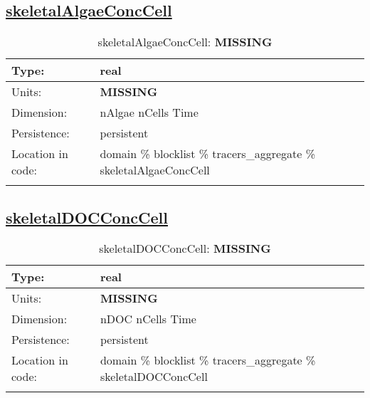 \subsection[skeletalAlgaeConcCell]{\hyperref[sec:var_tab_tracers_aggregate]{skeletalAlgaeConcCell}}
\label{subsec:var_sec_tracers_aggregate_skeletalAlgaeConcCell}
\begin{center}
\begin{longtable}{| p{2.0in} | p{4.0in} |}
        \hline 
        Type: & real \\
        \hline 
        Units: & {\bf \color{red} MISSING} \\
        \hline 
        Dimension: & nAlgae nCells Time \\
        \hline 
        Persistence: & persistent \\
        \hline 
         Location in code: & domain \% blocklist \% tracers\_aggregate \% skeletalAlgaeConcCell \\
         \hline 
    \caption{skeletalAlgaeConcCell: {\bf \color{red} MISSING}}
\end{longtable}
\end{center}
\subsection[skeletalDOCConcCell]{\hyperref[sec:var_tab_tracers_aggregate]{skeletalDOCConcCell}}
\label{subsec:var_sec_tracers_aggregate_skeletalDOCConcCell}
\begin{center}
\begin{longtable}{| p{2.0in} | p{4.0in} |}
        \hline 
        Type: & real \\
        \hline 
        Units: & {\bf \color{red} MISSING} \\
        \hline 
        Dimension: & nDOC nCells Time \\
        \hline 
        Persistence: & persistent \\
        \hline 
         Location in code: & domain \% blocklist \% tracers\_aggregate \% skeletalDOCConcCell \\
         \hline 
    \caption{skeletalDOCConcCell: {\bf \color{red} MISSING}}
\end{longtable}
\end{center}

